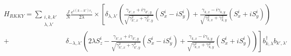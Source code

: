 \begin{align} \nonumber
    H_{RKKY} =  \sum_{\substack{i, k,k'\\ \lambda, \lambda'}} &\frac{J}{N} \frac{e^{i(k-k')r_i}}{2 \lambda}
    \times \left[  \delta_{\lambda,\lambda'} \left(  \frac{\gamma_{k',x} + i \gamma_{k',y}}{\sqrt{\gamma^2_{k',x} + \gamma^2_{k',y}}} (S^i_x-iS_y^i)   + \frac{\gamma_{k,x} - i \gamma_{k,y}}{\sqrt{\gamma^2_{k,x} + \gamma^2_{k,y}}} (S^i_x+iS_y^i)
    \right) \right. \\ \nonumber
    \left.  +\right. & \left. \delta_{-\lambda, \lambda'}\left( 2  \lambda S^i_z
    - \frac{\gamma_{k',x} + i \gamma_{k',y}}{\sqrt{\gamma^2_{k',x} + \gamma^2_{k',y}}} (S^i_x-iS_y^i)
    + \frac{\gamma_{k,x} - i \gamma_{k,y}}{\sqrt{\gamma^2_{k,x} + \gamma^2_{k,y}}} (S^i_x+iS_y^i) \right) \right] b^{\dag}_{k,\lambda}b_{k',\lambda'}
\end{align}
